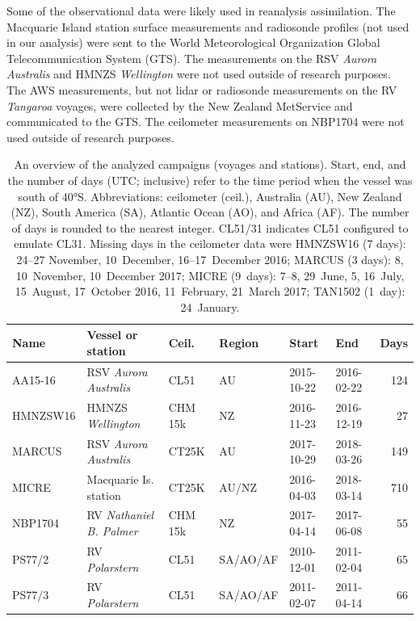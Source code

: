 \documentclass[draft]{agujournal2019}
\begin{document}
Some of the observational data were likely used in reanalysis assimilation. The Macquarie Island station surface measurements and radiosonde profiles (not used in our analysis) were sent to the World Meteorological Organization Global Telecommunication System (GTS). The measurements on the RSV \textit{Aurora Australis} and HMNZS \textit{Wellington} were not used outside of research purposes. The AWS measurements, but not lidar or radiosonde measurements on the RV \textit{Tangaroa} voyages, were collected by the New Zealand MetService and communicated to the GTS. The ceilometer measurements on NBP1704 were not used outside of research purposes.

\begin{table}[p!]
\caption{
An overview of the analyzed campaigns (voyages and stations). Start, end, and the number of days (UTC; inclusive) refer to the time period when the vessel was south of 40°S. Abbreviations: ceilometer (ceil.), Australia (AU), New Zealand (NZ), South America (SA), Atlantic Ocean (AO), and Africa (AF). The number of days is rounded to the nearest integer. CL51/31 indicates CL51 configured to emulate CL31. Missing days in the ceilometer data were HMNZSW16 (7 days): 24--27 November, 10~December, 16--17~December 2016; MARCUS (3 days): 8, 10~November, 10~December 2017; MICRE (9~days): 7--8, 29~June, 5, 16~July, 15~August, 17~October 2016, 11~February, 21~March 2017; TAN1502 (1~day): 24~January.
}
\label{tab:voyages}
\centering
\small
\begin{tabular}{llllllr}
\textbf{Name} & \textbf{Vessel or station} & \textbf{Ceil.} & \textbf{Region} & \textbf{Start} & \textbf{End} & \textbf{Days}\\
\hline
AA15-16  & RSV \emph{Aurora Australis}   & CL51    & AU       & 2015-10-22 & 2016-02-22 & 124 \\
HMNZSW16 & HMNZS \emph{Wellington}       & CHM 15k & NZ       & 2016-11-23 & 2016-12-19 & 27 \\
MARCUS   & RSV \emph{Aurora Australis}   & CT25K   & AU       & 2017-10-29 & 2018-03-26 & 149 \\
MICRE    & Macquarie Is. station         & CT25K   & AU/NZ    & 2016-04-03 & 2018-03-14 & 710 \\
NBP1704  & RV \emph{Nathaniel B. Palmer} & CHM 15k & NZ       & 2017-04-14 & 2017-06-08 & 55 \\
PS77/2   & RV \emph{Polarstern}          & CL51    & SA/AO/AF & 2010-12-01 & 2011-02-04 & 65 \\
PS77/3   & RV \emph{Polarstern}          & CL51    & SA/AO/AF & 2011-02-07 & 2011-04-14 & 66 \\

\end{tabular}
\end{table}
\end{document}

